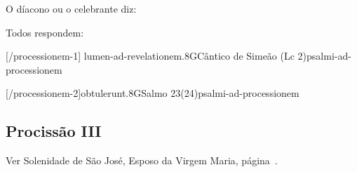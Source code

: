 {  \vspace{-20pt}

}{%
  \begin{paracol}{2}
  \end{paracol}


  \begin{rubrica}
    \begin{center}
      O díacono ou o celebrante diz:
    \end{center}
  \end{rubrica}

  \vspace{-20pt}

  \begin{paracol}{2}
  \end{paracol}

  \begin{rubrica}
    \begin{center}
      Todos respondem:
    \end{center}
  \end{rubrica}

  \vspace{-20pt}

  \begin{paracol}{2}
  \end{paracol}
}

\AllowPageFlush

[\Prefix/processionem-1]
{lumen-ad-revelationem.8G}{Cântico de Simeão (Lc 2)}{psalmi-ad-processionem}

\AllowPageFlush

[\Prefix/processionem-2]{obtulerunt.8G}{Salmo 23(24)}{psalmi-ad-processionem}

\subsection{Procissão III}
\begin{rubrica}
  Ver Solenidade de São José, Esposo da Virgem Maria, página~\pageref{subsection:proprium-sanctorum/sancti-ioseph-sponsi-bmv/psalmus-responsorius}.
\end{rubrica}

